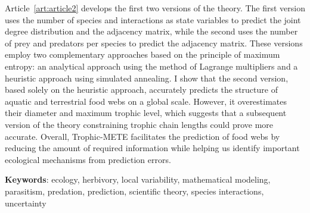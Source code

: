\documentclass[12pt,twoside,phd]{dms}
\numberwithin{equation}{section}
\numberwithin{table}{chapter}
\numberwithin{figure}{chapter}
\begin{document}
Article~\ref{art:article2} develops the first two versions of the theory. The
first version uses the number of species and interactions as state variables to
predict the joint degree distribution and the adjacency matrix, while the second
uses the number of prey and predators per species to predict the adjacency
matrix. These versions employ two complementary approaches based on the
principle of maximum entropy: an analytical approach using the method of
Lagrange multipliers and a heuristic approach using simulated annealing. I show
that the second version, based solely on the heuristic approach, accurately
predicts the structure of aquatic and terrestrial food webs on a global scale.
However, it overestimates their diameter and maximum trophic level, which
suggests that a subsequent version of the theory constraining trophic chain
lengths could prove more accurate. Overall, Trophic-METE facilitates the
prediction of food webs by reducing the amount of required information while
helping us identify important ecological mechanisms from prediction errors.

\textbf{Keywords}: ecology, herbivory, local variability, mathematical modeling,
parasitism, predation, prediction, scientific theory, species interactions,
uncertainty


\francais
\cleardoublepage
{}  %

\setlength{\parskip}{0pt} %

\tableofcontents
\cleardoublepage
{}  %
\listoftables
\cleardoublepage
{}
\listoffigures
\end{document}
